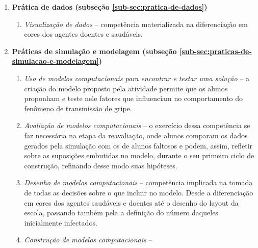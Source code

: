 \begin{enumerate}
  \item \textbf{Prática de dados (subseção \ref{sub-sec:pratica-de-dados})}
    \begin{enumerate}
      \item \textit{Visualização de dados} -- competência materializada na diferenciação em cores dos agentes doentes e saudáveis.
    \end{enumerate}

  \item \textbf{Práticas de simulação e modelagem (subseção \ref{sub-sec:praticas-de-simulacao-e-modelagem})}
    \begin{enumerate}
      \item \textit{Uso de modelos computacionais para encontrar e testar uma solução} -- a criação do modelo proposto pela atividade permite que os alunos proponham e teste nele fatores que influenciam no comportamento do fenômeno de transmissão de gripe.

      \item \textit{Avaliação de modelos computacionais} -- o exercício dessa competência se faz necessária na etapa da reavaliação, onde alunos comparam os dados gerados pela simulação com os de alunos faltosos e podem, assim, refletir sobre as suposições embutidas no modelo, durante o seu primeiro ciclo de construção, refinando desse modo suas hipóteses.

      \item \textit{Desenho de modelos computacionais} -- competência implicada na tomada de todas as decisões sobre o que incluir no modelo. Desde a diferenciação em cores dos agentes saudáveis e doentes até o desenho do layout da escola, passando também pela a definição do número daqueles inicialmente infectados.
      
      \item \textit{Construção de modelos computacionais} -- 
    
    \end{enumerate}





  
\end{enumerate}






